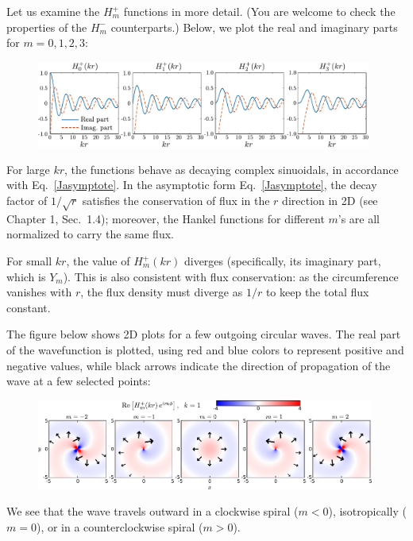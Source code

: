 \documentclass[prx,12pt]{revtex4-2}
\begin{document}
\clearpage

Let us examine the $H_m^+$ functions in more detail.  (You are welcome
to check the properties of the $H_m^-$ counterparts.)  Below, we plot
the real and imaginary parts for $m = 0, 1, 2, 3$:

\begin{figure}[h]
  \centering\includegraphics[width=0.98\textwidth]{besselh}
\end{figure}

\noindent
For large $kr$, the functions behave as decaying complex sinuoidals,
in accordance with Eq.~\eqref{Jasymptote}.  In the asymptotic form
Eq.~\eqref{Jasymptote}, the decay factor of $1/\sqrt{r}$ satisfies the
conservation of flux in the $r$ direction in 2D (see Chapter 1,
Sec.~1.4); moreover, the Hankel functions for different $m$'s are all
normalized to carry the same flux.

For small $kr$, the value of $H_m^+(kr)$ diverges (specifically, its
imaginary part, which is $Y_m$).  This is also consistent with flux
conservation: as the circumference vanishes with $r$, the flux density
must diverge as $1/r$ to keep the total flux constant.

The figure below shows 2D plots for a few outgoing circular waves.
The real part of the wavefunction is plotted, using red and blue
colors to represent positive and negative values, while black arrows
indicate the direction of propagation of the wave at a few selected
points:

\vskip 0.1in
\begin{figure}[h!]
  \centering\includegraphics[width=0.99\textwidth]{bessels}
\end{figure}

\noindent
We see that the wave travels outward in a clockwise spiral ($m < 0$),
isotropically ($m = 0$), or in a counterclockwise spiral ($m > 0$).
\end{document}
